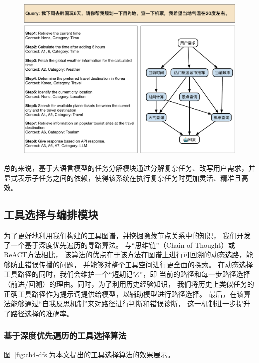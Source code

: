 \begin{figure}[!htp]
  \vspace{1em}
  \centering
  \setlength{\abovecaptionskip}{10pt} %
  \includegraphics[height=8cm]{../assets/ch4-任务分解模块.pdf}
  \label{fig:ch4-decomposition}
\end{figure}

总的来说，基于大语言模型的任务分解模块通过分解复杂任务、改写用户需求，并显式表示子任务之间的依赖，使得该系统在执行复杂任务时更加灵活、精准且高效。

\subsection{工具选择与编排模块}

为了更好地利用我们构建的工具图谱，并挖掘隐藏节点关系中的知识，
我们开发了一个基于深度优先遍历的寻路算法。
与“思维链”（Chain-of-Thought）或ReACT方法相比，
该算法的优点在于该方法在图谱上进行可回溯的动态选路，能够防止错误传播的问题，
并能够对整个工具空间进行更全面的探索。
在动态选择工具路径的同时，我们会维护一个“短期记忆”，即
当前的路径和每一步路径选择（前进/回溯）的理由。同时，为了利用历史经验知识，
我们将历史上类似任务的正确工具路径作为提示词提供给模型，以辅助模型进行路径选择。
最后，在该算法能够通过“自我反思机制”来对路径进行判断和错误诊断，
这一机制进一步提升了路径选择的准确率。

\subsubsection{基于深度优先遍历的工具选择算法}

图~\ref{fig:ch4-dfs}为本文提出的工具选择算法的效果展示。

